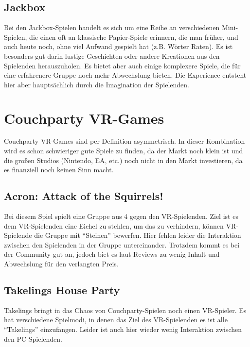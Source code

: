 \subsection{Jackbox}
Bei den Jackbox-Spielen handelt es sich um eine Reihe an verschiedenen Mini-Spielen, die einen oft an klassische Papier-Spiele erinnern, die man früher, und auch heute noch, ohne viel Aufwand gespielt hat (z.B. Wörter Raten). Es ist besonders gut darin lustige Geschichten oder andere Kreationen aus den Spielenden herauszuholen. Es bietet aber auch einige komplexere Spiele, die für eine erfahrenere Gruppe noch mehr Abwechslung bieten. Die Experience entsteht hier aber hauptsächlich durch die Imagination der Spielenden.

\section{Couchparty VR-Games}

Couchparty VR-Games sind per Definition asymmetrisch. In dieser Kombination wird es schon schwieriger gute Spiele zu finden, da der Markt noch klein ist und  die großen Studios (Nintendo, EA, etc.) noch nicht in den Markt investieren, da es finanziell noch keinen Sinn macht.

\subsection{Acron: Attack of the Squirrels!}
Bei diesem Spiel spielt eine Gruppe aus 4 gegen den VR-Spielenden. Ziel ist es dem VR-Spielenden eine Eichel zu stehlen, um das zu verhindern, können VR-Spielende die Gruppe mit "`Steinen"' bewerfen. Hier fehlen leider die Interaktion zwischen den Spielenden in der Gruppe untereinander. Trotzdem kommt es bei der Community gut an, jedoch biet es laut Reviews zu wenig Inhalt und Abwechslung für den verlangten Preis\cite{_acron_reviews}.

\subsection{Takelings House Party}
Takelings bringt in das Chaos von Couchparty-Spielen noch einen VR-Spieler. Es hat verschiedene Spielmodi, in denen das Ziel des VR-Spielenden es ist alle "`Takelings"' einzufangen. Leider ist auch hier wieder wenig Interaktion zwischen den PC-Spielenden.